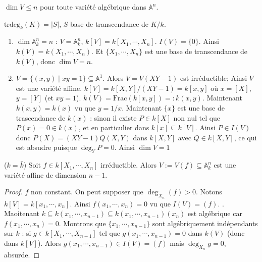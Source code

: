             \begin{remq}
                $\dim V \leq n$ pour toute variété algébrique dans $\mathbb{A}^n$.
            \end{remq}
            \begin{defi}
                $\mathrm{trdeg}_k(K) = |S|$, $S$ base de transcendance de $K/k$.
            \end{defi}
            \begin{expl}
                \begin{enumerate}
                    \item $\dim \mathbb{A}_k^n = n$ : $V = \mathbb{A}_k^n$, $k[V] = k[X_1, \cdots, X_n]$. $I(V) = \{0\}$. Ainsi $k(V) = k(X_1, \cdots, X_n)$. Et $\{X_1, \cdots, X_n\}$ est une base de transcendance de $k(V)$, donc $\dim V = n$.
                    \item $V = \{(x,y) \mid xy = 1\} \subseteq \mathbb{A}^1$. Alors $V = V(XY - 1)$ est irréductible; Ainsi $V$ est une variété affine. $k[V] = k[X,Y]/(XY - 1) = k[x,y]$ où $x = [X]$, $y = [Y]$ (et $xy = 1$). $k(V) = \mathrm{Frac} (k[x,y]) =: k(x,y)$. Maintenant $k(x,y) = k(x)$ vu que $y = 1/x$. Maintenant $\{x\}$ est une base de trascendance de $k(x)$ : sinon il existe $P \in k[X]$ non nul tel que $P(x) = 0 \in k(x)$, et en particulier dans $k[x] \subseteq k[V]$. Ainsi $P \in I(V)$ donc $P(X) = (XY - 1)Q(X,Y)$ dans $k[X,Y]$ avec $Q \in k[X,Y]$, ce qui est absudre puisque $\deg_YP = 0$. Ainsi $\dim V = 1$
                \end{enumerate} 
            \end{expl}
            \begin{lemm}
                ($k = \bar k$) Soit $f \in k[X_1, \cdots, X_n]$ irréductible. Alors $V := V(f) \subseteq \mathbb{A}_k^n$ est une variété affine de dimension $n-1$.
            \end{lemm}
            \begin{proof}
                $f$ non constant. On peut supposer que $\deg_{X_n}(f) > 0$. Notons $k[V] = k[x_1, \cdots, x_n]$. Ainsi $f(x_1, \cdots, x_n) = 0$ vu que $I(V) = (f)$. . Maoitenant $k \subseteq k(x_1, \cdots, x_{n-1}) \subseteq k(x_1, \cdots, x_{n-1})(x_n)$ est algébrique car $f(x_1, \cdots, x_n) = 0$. Montrons que $\{x_1, \cdots, x_{n-1}\}$ sont algébriquement indépendants sur $k$ : si $g \in k[X_1, \cdots, X_{n-1}]$ tel que $g(x_1, \cdots, x_{n-1}) = 0$ dans $k(V)$ (donc dans $k[V]$). Alors $g(x_1, \cdots, x_{n-1}) \in I(V) = (f)$ mais $\deg_{X_n} g = 0$, absurde.
            \end{proof}
